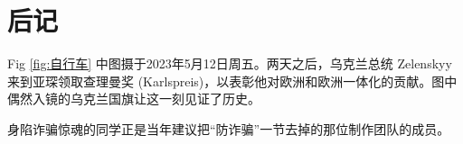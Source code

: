 
\chapter*{后记}


  Fig \ref{fig:自行车} 中图摄于2023年5月12日周五。两天之后，乌克兰总统 Zelenskyy 来到亚琛领取查理曼奖 (Karlspreis)，以表彰他对欧洲和欧洲一体化的贡献。图中偶然入镜的乌克兰国旗让这一刻见证了历史。

  身陷诈骗惊魂的同学正是当年建议把``防诈骗''一节去掉的那位制作团队的成员。